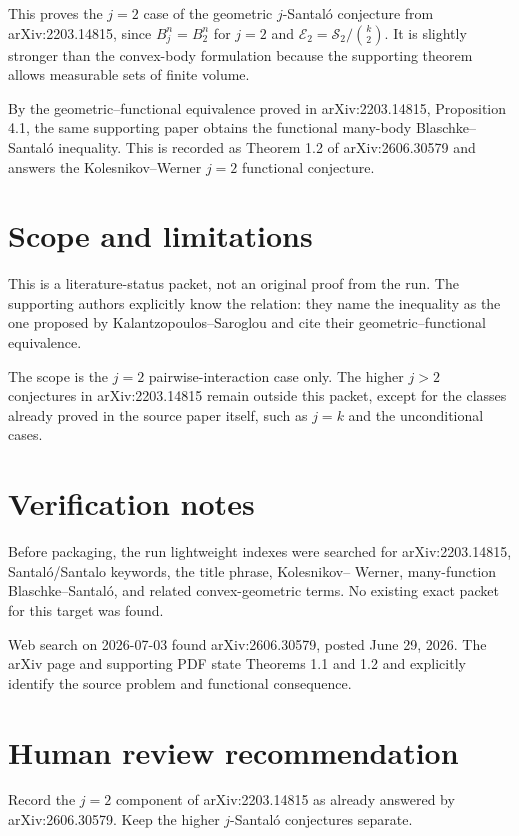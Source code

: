 \documentclass[11pt]{article}
\begin{document}
This proves the \(j=2\) case of the geometric \(j\)-Santaló conjecture from
arXiv:2203.14815, since \(B_j^n=B_2^n\) for \(j=2\) and
\(\mathcal{E}_2=\mathcal{S}_2/{k\choose 2}\).  It is slightly stronger than
the convex-body formulation because the supporting theorem allows measurable
sets of finite volume.

By the geometric--functional equivalence proved in arXiv:2203.14815,
Proposition 4.1, the same supporting paper obtains the functional many-body
Blaschke--Santaló inequality.  This is recorded as Theorem 1.2 of
arXiv:2606.30579 and answers the Kolesnikov--Werner \(j=2\) functional
conjecture.

\section*{Scope and limitations}

This is a literature-status packet, not an original proof from the run.  The
supporting authors explicitly know the relation: they name the inequality as
the one proposed by Kalantzopoulos--Saroglou and cite their
geometric--functional equivalence.

The scope is the \(j=2\) pairwise-interaction case only.  The higher
\(j>2\) conjectures in arXiv:2203.14815 remain outside this packet, except
for the classes already proved in the source paper itself, such as \(j=k\)
and the unconditional cases.

\section*{Verification notes}

Before packaging, the run lightweight indexes were searched for
arXiv:2203.14815, Santaló/Santalo keywords, the title phrase, Kolesnikov--
Werner, many-function Blaschke--Santaló, and related convex-geometric terms.
No existing exact packet for this target was found.

Web search on 2026-07-03 found arXiv:2606.30579, posted June 29, 2026.  The
arXiv page and supporting PDF state Theorems 1.1 and 1.2 and explicitly
identify the source problem and functional consequence.

\section*{Human review recommendation}

Record the \(j=2\) component of arXiv:2203.14815 as already answered by
arXiv:2606.30579.  Keep the higher \(j\)-Santaló conjectures separate.
\end{document}
